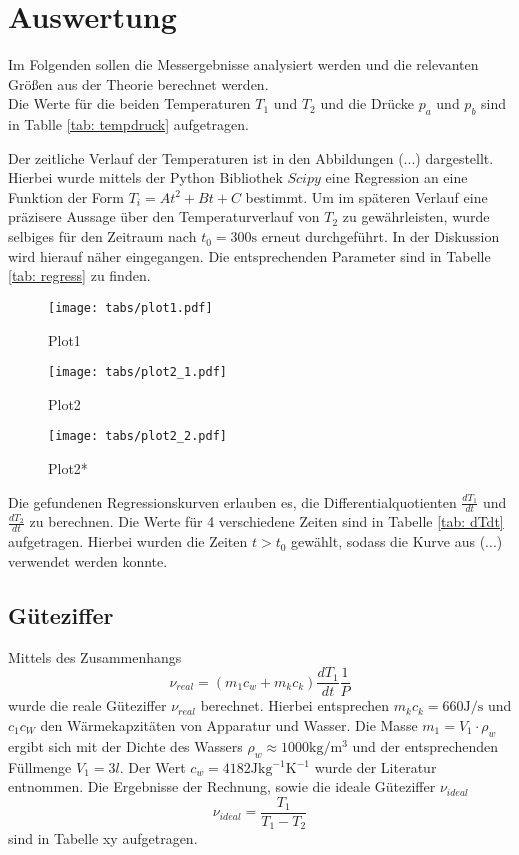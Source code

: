 \section{Auswertung}
Im Folgenden sollen die Messergebnisse analysiert werden und die relevanten Größen aus der Theorie berechnet werden. \\
Die Werte für die beiden Temperaturen $T_1$ und $T_2$ und die Drücke $p_a$ und $p_b$ sind in Tablle \ref{tab: tempdruck} aufgetragen.

Der zeitliche Verlauf der Temperaturen ist in den Abbildungen (...) dargestellt. Hierbei wurde mittels der Python Bibliothek $Scipy$ eine
Regression an eine Funktion der Form $T_i = A t^2 + B t + C$ bestimmt. Um im späteren Verlauf eine präzisere Aussage über den Temperaturverlauf
von $T_2$ zu gewährleisten, wurde selbiges für den Zeitraum nach $t_0 = 300 \si{\second}$ erneut durchgeführt. In der Diskussion wird hierauf näher eingegangen. Die entsprechenden
Parameter sind in Tabelle \ref{tab: regress} zu finden. \\
\begin{figure}[h]
  \centering
  \texttt{[image: tabs/plot1.pdf]}
  \caption{Plot1}
  \label{fig: Plot1}
\end{figure}

\begin{figure}[h]
  \centering
  \texttt{[image: tabs/plot2\_1.pdf]}
  \caption{Plot2}
  \label{fig: Plot2}
\end{figure}

\begin{figure}[h]
  \centering
  \texttt{[image: tabs/plot2\_2.pdf]}
  \caption{Plot2*}
  \label{fig: Plot2*}
\end{figure}


Die gefundenen Regressionskurven erlauben es, die Differentialquotienten $\frac{dT_1}{dt}$ und $\frac{dT_2}{dt}$ zu berechnen. Die Werte für 4 verschiedene Zeiten sind
in Tabelle \ref{tab: dTdt} aufgetragen. Hierbei wurden die Zeiten $t > t_0$ gewählt, sodass die Kurve aus (...) verwendet werden konnte.

\subsection{Güteziffer}

Mittels des Zusammenhangs
\begin{equation}
  \nu_{real} = (m_1 c_w + m_k c_k) \frac{dT_1}{dt} \frac{1}{P}
\end{equation}
wurde die reale Güteziffer $\nu_{real}$ berechnet. Hierbei entsprechen $m_k c_k = 660 \si{\joule \per \second}$ und $c_1 c_W$ den Wärmekapzitäten von Apparatur und Wasser. Die Masse $m_1 = V_1 \cdot \rho_w$ ergibt sich mit
der Dichte des Wassers $\rho_w \approx 1000 \si{\kilo \gram \per \meter ^3}$ und der entsprechenden Füllmenge $V_1 = 3 l$. Der Wert $c_w = 4182\si{\joule \kilo \gram^{-1} \kelvin^{-1}}$ wurde der Literatur entnommen. Die Ergebnisse
der Rechnung, sowie die ideale Güteziffer $\nu_{ideal}$
\begin{equation}
  \nu_{ideal} = \frac{T_1}{T_1 - T_2}
\end{equation}
sind in Tabelle xy aufgetragen.


